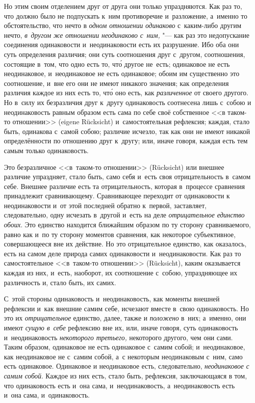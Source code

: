 Но этим своим отделением друг от друга они только упраздняются. Как раз то,
что должно было не подпускать к~ним противоречие и~разложение, а~именно то
обстоятельство, что нечто в {\em одном отношении одинаково}
с~каким-либо другим нечто,
{\em в~другом же отношении неодинаково с~ним,} "--- как раз это
недопускание соединения одинаковости и~неодинаковости есть их разрушение.
Ибо оба они суть определения различия; они суть соотношения друг с~другом,
соотношения, состоящие в~том, что одно есть то, чт\'{о} другое не~есть;
одинаковое не есть неодинаковое, и~неодинаковое не есть одинаковое; обоим
им существенно это соотношение, и~вне его они не имеют никакого значения;
как определения различия каждое из них есть то, чт\'{о} оно есть, как
{\em различенное} от своего другого. Но в~силу их
безразличия друг к~другу одинаковость соотнесена лишь с~собою и
неодинаковость равным образом есть сама по себе своё собственное <<в
таком-то отношении>> (eigene Rücksicht) и~самостоятельная рефлексия; каждая,
стало быть, одинакова с~самой собою; различие исчезло, так как они не имеют
никакой определённости по отношению друг к~другу; или, иначе говоря, каждая
есть тем самым только одинаковость.

Это безразличное <<в~таком-то отношении>> (Rücksicht) или внешнее различие
упраздняет, стало быть, само себя и~есть своя отрицательность в~самом себе.
Внешнее различие есть та отрицательность, которая в~процессе сравнения
принадлежит сравнивающему. Сравнивающее переходит от одинаковости к
неодинаковости и~от этой последней обратно к~первой, заставляет,
следовательно, одну исчезать в~другой и~есть на деле
{\em отрицательное единство обоих}. Это единство
находится ближайшим образом по ту сторону сравниваемого, равно как и~по ту
сторону моментов сравнения, как некоторое субъективное, совершающееся вне
их действие. Но это отрицательное единство, как оказалось, есть на самом
деле природа самих одинаковости и~неодинаковости. Как раз то
самостоятельное <<в~таком-то отношении>> (Rücksicht), каким оказывается
каждая из них, и~есть, наоборот, их соотношение с~собою, упраздняющее их
различность и, стало быть, их самих.

С~этой стороны одинаковость и~неодинаковость, как моменты внешней рефлексии
и~как внешние самим себе, исчезают вместе в~свою одинаковость. Но это их
{\em отрицательное} единство, далее, также и
{\em положено} в~них; а~именно, они имеют
{\em сущую в~себе} рефлексию вне их, или, иначе говоря,
суть одинаковость и~неодинаковость {\em некоторого
третьего,} некоторого другого, чем они сами. Таким образом, одинаковое не
есть одинаковое с~самим собой; и~неодинаковое, как неодинаковое не с~самим
собой, а~с некоторым неодинаковым с~ним, само есть одинаковое. Одинаковое и
неодинаковое есть, следовательно, {\em неодинаковое с
самим собой}. Каждое из них есть, стало быть, рефлексия, заключающаяся в
том, что одинаковость есть и~она сама, и~неодинаковость, а~неодинаковость
есть и~она сама, и~одинаковость.

